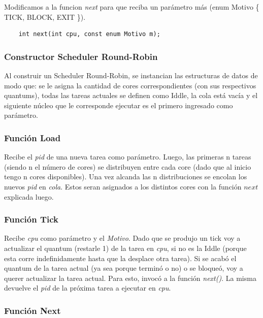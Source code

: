 \documentclass[a4paper]{article}
\begin{document}
\noindent  Modificamos a la funcion \emph{next} para que reciba un par\'ametro m\'as (enum Motivo \{ TICK, BLOCK, EXIT \}).
	\begin{codesnippet}
	\begin{verbatim}
    int next(int cpu, const enum Motivo m);
	\end{verbatim}
	\end{codesnippet}
		
\subsubsection*{Constructor Scheduler Round-Robin}		

Al construir un Scheduler Round-Robin, se instancian las estructuras de datos de modo que: se le asigna la cantidad de cores correspondientes (con sus respectivos quantums), todas las tareas actuales se definen como Iddle, la cola est\'a vac\'ia y el siguiente n\'ucleo que le corresponde ejecutar es el primero ingresado como par\'ametro.

\subsubsection*{Funci\'on Load}

Recibe el \emph{pid} de una nueva tarea como par\'ametro. Luego, las primeras n tareas (siendo n el número de cores) se distribuyen entre cada core (dado que al inicio tengo n cores disponibles). Una vez alcanda las n distribuciones se encolan los nuevos \emph{pid} en \emph{cola}. Estos seran asignados a los distintos cores con la función $next$ explicada luego.

\subsubsection*{Funci\'on Tick}	

Recibe \emph{cpu} como par\'ametro y el \emph{Motivo}. Dado que se produjo un tick voy a actualizar el quantum (restarle 1) de la tarea en \emph{cpu}, si no es la Iddle (porque esta corre indefinidamente hasta que la desplace otra tarea). 
Si se acab\'o el quantum de la tarea actual (ya sea porque termin\'o o no) o se bloque\'o, voy a querer actualizar la tarea actual. Para esto, invocó a la funci\'on \emph{next()}. La misma devuelve el \emph{pid} de la próxima tarea a ejecutar en \emph{cpu}.

\subsubsection*{Funci\'on Next}	
	
\end{document}
